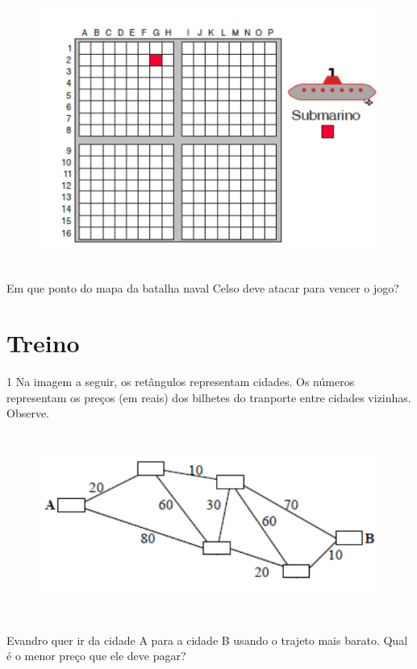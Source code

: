 \begin{figure}[H]
\centering\includegraphics[width=5in,height=3.55208in]{./imgSAEB_6_MAT/media/image73.png}
\end{figure}

Em que ponto do mapa da batalha naval Celso deve atacar para vencer o jogo?


\section*{Treino}

\num{1}  Na imagem a seguir, os retângulos representam cidades. Os números
representam os preços (em reais) dos bilhetes do tranporte entre cidades vizinhas. Observe.

\begin{figure}[H]
\centering\includegraphics[width=5.90625in,height=2.38542in]{./imgSAEB_6_MAT/media/image74.png}
\end{figure}

Evandro quer ir da cidade A para a cidade B usando o trajeto mais
barato.
Qual é o menor preço que ele deve pagar?

